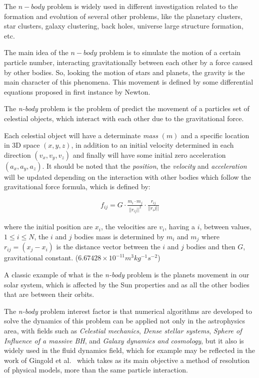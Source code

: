 The $n-body$ problem is widely used in different investigation
related to the formation and evolution of several other problems,
like the planetary clusters, star clusters, galaxy clustering, back holes,
universe large structure formation, etc.

The main idea of the $n-body$ problem is to simulate the
motion of a certain particle number, interacting gravitationally
between each other by a force caused by other bodies.
So, looking the motion of stars and planets, the gravity
is the main character of this phenomena.
This movement is defined by some differential equations
proposed in first instance by Newton.

The \emph{n-body} problem is the problem of
predict the movement of a particles set of celestial objects,
which interact with each other due to the gravitational force.

Each celestial object will have a determinate \emph{mass} $(m)$
and a specific location in 3D space
$(x, y, z)$, in addition to an initial velocity
determined in each direction $(v_{x}, v_{y}, v_{z})$ and finally
will have some initial zero acceleration $(a_{x}, a_{y}, a_{z})$.
It should be noted that the \emph{position}, the \emph{velocity} and \emph{acceleration}
will be updated depending on the interaction with other bodies
which follow the gravitational force formula,
which is defined by:

\begin{eqnarray}
    f_{ij} =G \cdot \frac{m_i \cdot m_j}{||r_{ij}||^{2}} \cdot \frac{r_{ij}}{||r_ij||}
\end{eqnarray}

where the initial position are $x_{i}$,
the velocities are $v_{i}$,
having a $i$, between values, $1\leq i\leq N$,
the $i$ and $j$ bodies mass is determined by $m_{i}$ and $m_{j}$
where $r_{ij} = (x_{j} - x_{i})$ is the distance vector between the $i$ and $j$ bodies
and then $G$, gravitational constant. ($6.67428\times 10^{-11} m^{3} kg^{-1} s^{-2}$)

A classic example of what is the \emph{n-body} problem
is the planets movement in our solar system,
which is affected by the Sun properties
and as all the other bodies that are between their orbits.

The \emph{n-body} problem interest factor
is that numerical algorithms are developed to solve
the dynamics of this problem can be applied not only in the astrophysics area,
with fields such as \emph{Celestial mechanics}, \emph{Dense stellar systems},
\emph{Sphere of Influence of a massive BH}, and \emph{Galaxy dynamics and cosmology},
but it also is widely used in the fluid dynamics field,
which for example may be reflected in the work of Gingold et al.~\cite{Gingold}
which takes as its main objective a method of resolution of physical models,
more than the same particle interaction.

